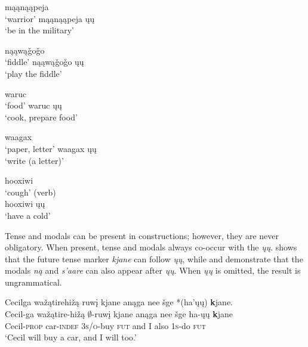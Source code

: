 \documentclass[output=paper]{LSP/langsci}
\begin{document}
\ea\label{ex:johnson:14}
\begin{multicols}{2}
\ea 
mąąnąąpeja\\
`warrior'
\ex 
mąąnąąpeja ųų\\
`be in the military'
\z
\end{multicols}
\z
 
\ea\label{ex:johnson:15}
\begin{multicols}{2}
\ea 
nąąwą\v{g}o\v{g}o\\
`fiddle'
\ex 
nąąwą\v{g}o\v{g}o ųų\\
`play the fiddle'
\z
\end{multicols}
\z
 
\ea\label{ex:johnson:16}
\begin{multicols}{2}
\ea 
waruc\\
`food'
\ex 
waruc ųų\\
`cook, prepare food'
\z
\end{multicols}
\z
 
\ea\label{ex:johnson:17}
\begin{multicols}{2}
\ea 
waagax\\
`paper, letter'
\ex 
waagax ųų\\
`write (a letter)'
\z
\end{multicols}
\z
 
\ea\label{ex:johnson:18}
\begin{multicols}{2}
\ea 
hooxiwi\\
`cough' (verb)\\

\ex 
hooxiwi ųų\\
`have a cold'
\z
\end{multicols}
\z

Tense and modals can be present in  constructions; however, they are never obligatory. When present, tense and modals always co-occur with the  \emph{ųų}.  shows that the future tense marker \emph{kjane} can follow \emph{ųų}, while  and  demonstrate that the modals \emph{ną} and \emph{s'aare} can also appear after \emph{ųų}. When \emph{ųų} is omitted, the result is ungrammatical.
 
\ea\label{ex:johnson:19}
\ea\label{ex:johnson:19a} 
\glll Cecilga wažątirehižą ruwį kjane anąga nee šge *(ha'ųų) {\textbf kjane}.\\
Cecil-ga wažątire-hižą $\emptyset$-ruwį kjane anąga nee šge ha-ųų {\textbf kjane}\\
Cecil-\textsc{prop} car-\textsc{indef} \textsc{3s/o}-buy \textsc{fut} and I also \textsc{1s}-do \textsc{fut}\\
\trans `Cecil will buy a car, and I will too.' 
 
\end{document}
